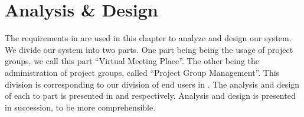 \chapter{Analysis \& Design}
%
\label{chap:analysis}%
\label{chap:design}%
\label{chap:analdesign}%
The requirements in  are used in this chapter to analyze and design our system.
We divide our system into two parts.
One part being being the usage of project groups, we call this part ``Virtual Meeting Place''.
The other being the administration of project groups, called ``Project Group Management''.
This division is corresponding to our division of end users in .
The analysis and design of each to part is presented in  and  respectively.
Analysis and design is presented in succession, to be more comprehensible.






